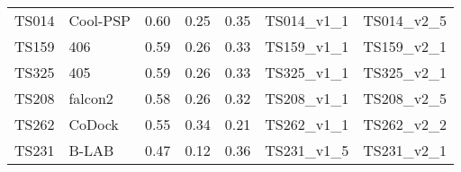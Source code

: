 \begin{table}[ht]
{\begin{tabular}{llrrrll}
TS014 & Cool-PSP & 0.60 & 0.25 & 0.35 & TS014\_v1\_1 & TS014\_v2\_5 \\ 
TS159 & 406 & 0.59 & 0.26 & 0.33 & TS159\_v1\_1 & TS159\_v2\_1 \\ 
TS325 & 405 & 0.59 & 0.26 & 0.33 & TS325\_v1\_1 & TS325\_v2\_1 \\ 
TS208 & falcon2 & 0.58 & 0.26 & 0.32 & TS208\_v1\_1 & TS208\_v2\_5 \\ 
TS262 & CoDock & 0.55 & 0.34 & 0.21 & TS262\_v1\_1 & TS262\_v2\_2 \\ 
TS231 & B-LAB & 0.47 & 0.12 & 0.36 & TS231\_v1\_5 & TS231\_v2\_1 \\ 
\bottomrule
\end{tabular}%
}
\end{table}
